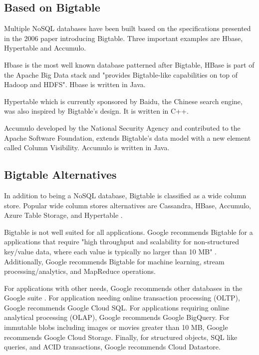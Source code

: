 \documentclass[9pt,twocolumn,twoside]{../../styles/osajnl}
\begin{document}
\subsection{Based on Bigtable}

Multiple NoSQL databases have been built based on the specifications presented in the 2006 paper introducing Bigtable. Three important examples are Hbase, Hypertable and Accumulo.

Hbase \cite{www-hbase} is the most well known database patterned after Bigtable, HBase is part of the Apache Big Data stack and "provides Bigtable-like capabilities on top of Hadoop and HDFS"\cite{www-hbase}.  Hbase is written in Java.

Hypertable \cite{www-wikihypertable} which is currently sponsored by Baidu, the Chinese search engine, was also inspired by Bigtable's design.  It is written in C++.

Accumulo \cite{www-wikiaccumulo} developed by the National Security Agency and contributed to the Apache Software Foundation, extends Bigtable's data model with a new element called Column Visibility.  Accumulo is written in Java.

\subsection{Bigtable Alternatives}

In addition to being a NoSQL database, Bigtable is classified as a wide column store.  Popular wide column stores alternatives are Cassandra, HBase, Accumulo, Azure Table Storage, and Hypertable \cite{www-dbengineswide}.

Bigtable is not well suited for all applications.  Google recommends Bigtable for a applications that require "high throughput and scalability for non-structured key/value data, where each value is typically no larger than 10 MB" \cite{www-bigtabledocoverview}.  Additionally, Google recommends Bigtable for machine learning, stream processing/analytics, and MapReduce operations.\cite{www-bigtabledocoverview}

For applications with other needs, Google recommends other databases in the Google suite \cite{www-bigtabledocoverview}. For application needing online transaction processing (OLTP), Google recommends Google Cloud SQL. For applications requiring online analytical processing (OLAP), Google recommends Google BigQuery. For immutable blobs including images or movies greater than 10 MB, Google recommends Google Cloud Storage.  Finally, for structured objects, SQL like queries, and ACID transactions, Google recommends Cloud Datastore.
\end{document}
